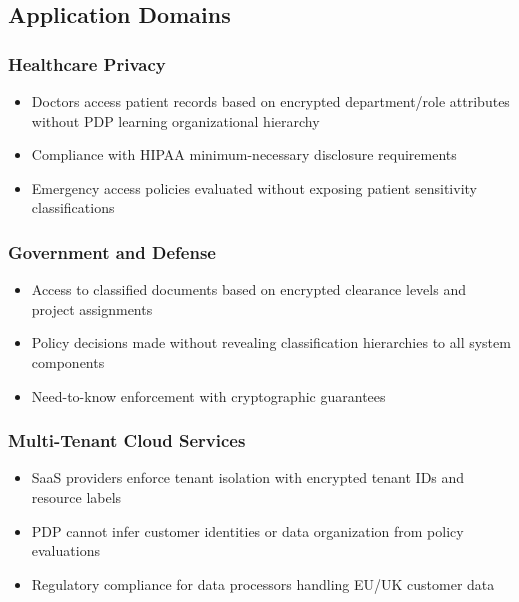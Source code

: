 \subsection{Application Domains}

\subsubsection{Healthcare Privacy}

\begin{itemize}
    \item Doctors access patient records based on encrypted department/role attributes without PDP learning organizational hierarchy
    \item Compliance with HIPAA minimum-necessary disclosure requirements
    \item Emergency access policies evaluated without exposing patient sensitivity classifications
\end{itemize}

\subsubsection{Government and Defense}

\begin{itemize}
    \item Access to classified documents based on encrypted clearance levels and project assignments
    \item Policy decisions made without revealing classification hierarchies to all system components
    \item Need-to-know enforcement with cryptographic guarantees
\end{itemize}

\subsubsection{Multi-Tenant Cloud Services}

\begin{itemize}
    \item SaaS providers enforce tenant isolation with encrypted tenant IDs and resource labels
    \item PDP cannot infer customer identities or data organization from policy evaluations
    \item Regulatory compliance for data processors handling EU/UK customer data
\end{itemize}

